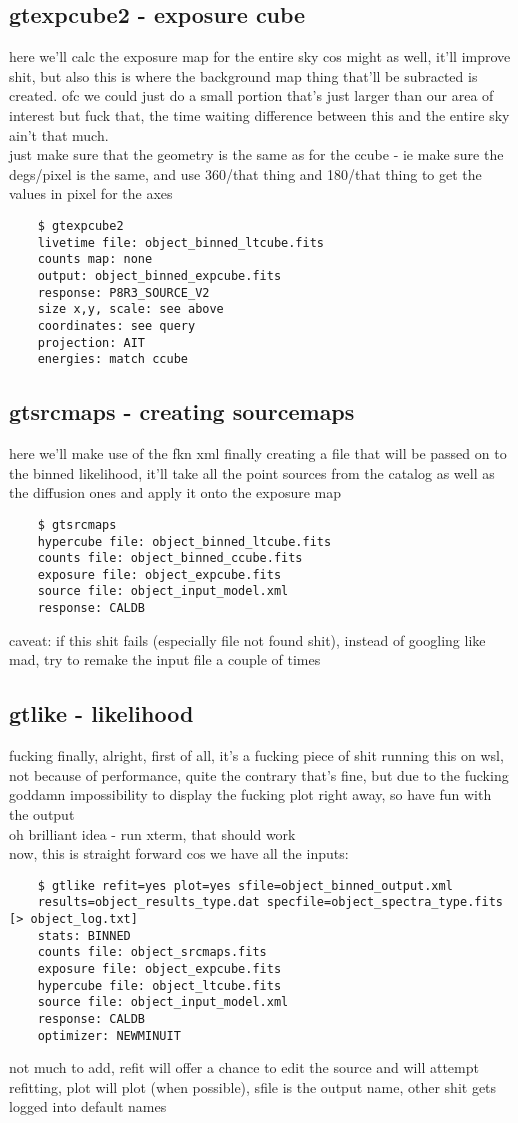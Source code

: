 \documentclass{article}
\begin{document}
\subsection{gtexpcube2 - exposure cube}%
here we'll calc the exposure map for the entire sky cos might as well, it'll improve shit, but also this is where the background map thing that'll be subracted is created. ofc we could just do a small portion that's just larger than our area of interest but fuck that, the time waiting difference between this and the entire sky ain't that much.\\
just make sure that the geometry is the same as for the ccube - ie make sure the degs/pixel is the same, and use 360/that thing and 180/that thing to get the values in pixel for the axes
\begin{verbatim}
    $ gtexpcube2
    livetime file: object_binned_ltcube.fits
    counts map: none
    output: object_binned_expcube.fits
    response: P8R3_SOURCE_V2
    size x,y, scale: see above
    coordinates: see query
    projection: AIT
    energies: match ccube
\end{verbatim}

\subsection{gtsrcmaps - creating sourcemaps}%
here we'll make use of the fkn xml finally creating a file that will be passed on to the binned likelihood, it'll take all the point sources from the catalog as well as the diffusion ones and apply it onto the exposure map
\begin{verbatim}
    $ gtsrcmaps
    hypercube file: object_binned_ltcube.fits
    counts file: object_binned_ccube.fits
    exposure file: object_expcube.fits
    source file: object_input_model.xml
    response: CALDB
\end{verbatim}
caveat: if this shit fails (especially file not found shit), instead of googling like mad, try to remake the input file a couple of times
\subsection{gtlike - likelihood}%
fucking finally, alright, first of all, it's a fucking piece of shit running this on wsl, not because of performance, quite the contrary that's fine, but due to the fucking goddamn impossibility to display the fucking plot right away, so have fun with the output\\
oh brilliant idea - run xterm, that should work\\
now, this is straight forward cos we have all the inputs:
\begin{verbatim}
    $ gtlike refit=yes plot=yes sfile=object_binned_output.xml
    results=object_results_type.dat specfile=object_spectra_type.fits [> object_log.txt]
    stats: BINNED
    counts file: object_srcmaps.fits
    exposure file: object_expcube.fits
    hypercube file: object_ltcube.fits
    source file: object_input_model.xml
    response: CALDB
    optimizer: NEWMINUIT
\end{verbatim}
not much to add, refit will offer a chance to edit the source and will attempt refitting, plot will plot (when possible), sfile is the output name, other shit gets logged into default names
\end{document}
